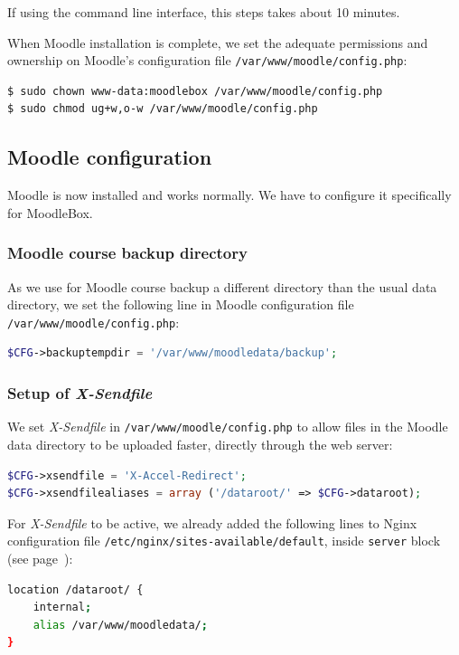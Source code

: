 \documentclass[12pt]{article}
\begin{document}
If using the command line interface, this steps takes about 10 minutes.

When Moodle installation is complete, we set the adequate permissions and ownership on Moodle's configuration file \lstinline{/var/www/moodle/config.php}:
\begin{lstlisting}[language=bash]
$ sudo chown www-data:moodlebox /var/www/moodle/config.php
$ sudo chmod ug+w,o-w /var/www/moodle/config.php
\end{lstlisting}

\subsection{Moodle configuration}

Moodle is now installed and works normally.
We have to configure it specifically for MoodleBox.

\subsubsection{Moodle course backup directory}

As we use for Moodle course backup a different directory than the usual data directory, we set the following line in Moodle configuration file \lstinline{/var/www/moodle/config.php}:
\begin{lstlisting}[language=php]
$CFG->backuptempdir = '/var/www/moodledata/backup';
\end{lstlisting}

\subsubsection{Setup of \emph{X-Sendfile}}

We set \emph{X-Sendfile} in \lstinline{/var/www/moodle/config.php} to allow files in the Moodle data directory to be uploaded faster, directly through the web server:
\begin{lstlisting}[language=php]
$CFG->xsendfile = 'X-Accel-Redirect';
$CFG->xsendfilealiases = array ('/dataroot/' => $CFG->dataroot);
\end{lstlisting}
For \emph{X-Sendfile} to be active, we already added the following lines to Nginx configuration file \lstinline{/etc/nginx/sites-available/default}, inside \lstinline{server} block (see page~\pageref{ssec-nginx-php}):
\begin{lstlisting}[language=bash]
location /dataroot/ {
    internal;
    alias /var/www/moodledata/;
}
\end{lstlisting}
\end{document}
